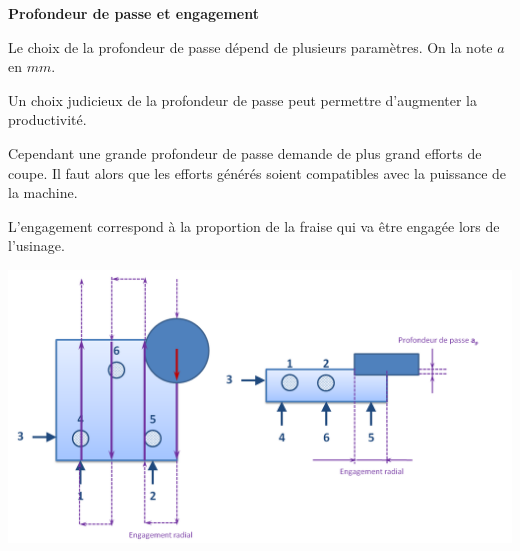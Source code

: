 \documentclass[11pt,oneside]{article}
\begin{document}
\begin{defi}
\textbf{Profondeur de passe et engagement}

Le choix de la profondeur de passe dépend de plusieurs paramètres. On la note $a$ en $mm$. 

Un choix judicieux de la profondeur de passe peut permettre d'augmenter la productivité. 

Cependant une grande profondeur de passe demande de plus grand efforts de coupe. Il faut alors que les efforts générés soient compatibles avec la puissance de la machine.

L'engagement correspond à la proportion de la fraise qui va être engagée lors de l'usinage.
	
\end{defi}

\begin{exemple}
\begin{center}
\includegraphics[width=.8\textwidth]{png/engagement_radial}
\end{center}
\end{exemple}

\begin{thebibliography}{2}
\end{thebibliography}
\end{document}
